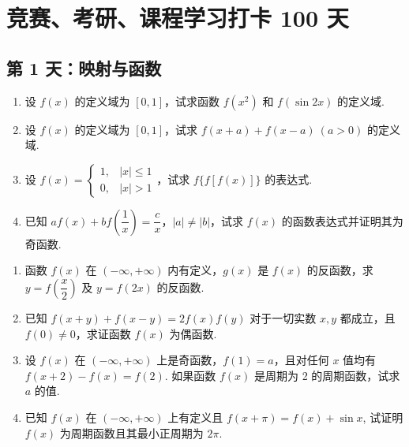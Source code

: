 \section*{竞赛、考研、课程学习打卡 100 天}
\subsection*{第 1 天：映射与函数}
\vspace{1cm}

\begin{enumerate}[label=\textbf{\arabic*.}, itemsep=6cm] %
    \item 设 $f(x)$ 的定义域为 $[0, 1]$，试求函数 $f(x^2)$ 和 $f(\sin 2x)$ 的定义域.
    
    \item 设 $f(x)$ 的定义域为 $[0, 1]$，试求 $f(x+a) + f(x-a) \ (a > 0)$ 的定义域.
    
    \item 设 $f(x) = \begin{cases} 1, & |x| \le 1 \\ 0, & |x| > 1 \end{cases}$，试求 $f\{f[f(x)]\}$ 的表达式.
    
    \item 已知 $a f(x) + b f\left( \dfrac{1}{x} \right) = \dfrac{c}{x}$，$|a| \ne |b|$，试求 $f(x)$ 的函数表达式并证明其为奇函数.
\end{enumerate}

\newpage

\begin{enumerate}[label=\textbf{\arabic*.}, itemsep=6cm, resume]
    \item 函数 $f(x)$ 在 $(-\infty, +\infty)$ 内有定义，$g(x)$ 是 $f(x)$ 的反函数，求 $y = f\left( \dfrac{x}{2} \right)$ 及 $y = f(2x)$ 的反函数.
    
    \item 已知 $f(x+y) + f(x-y) = 2f(x)f(y)$ 对于一切实数 $x, y$ 都成立，且 $f(0) \ne 0$，求证函数 $f(x)$ 为偶函数.
    
    \item 设 $f(x)$ 在 $(-\infty, +\infty)$ 上是奇函数，$f(1) = a$，且对任何 $x$ 值均有
    $f(x+2) - f(x) = f(2). $
    如果函数 $f(x)$ 是周期为 2 的周期函数，试求 $a$ 的值.
    
    \item 已知 $f(x)$ 在 $(-\infty, +\infty)$ 上有定义且
    $f(x+\pi) = f(x) + \sin x$, 
    试证明 $f(x)$ 为周期函数且其最小正周期为 $2\pi$.
\end{enumerate}

